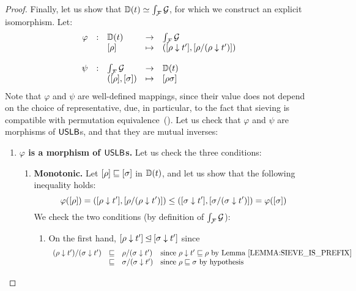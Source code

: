 \begin{proof}
Finally, let us show that $\mathbb{D}(t) \simeq \int_{\mathcal{F}}{\mathcal{G}}$,
for which we construct an explicit isomorphism.
Let:
\[
\begin{array}{rclcl}
  \varphi & : & \mathbb{D}(t)        & \to     & \int_{\mathcal{F}}{\mathcal{G}} \\
             &&    {[\rho]} & \mapsto & ({[\rho \downarrow t']}, {[\rho/(\rho \downarrow t')]}) \\
\\
  \psi    & : & \int_{\mathcal{F}}{\mathcal{G}} & \to & \mathbb{D}(t) \\
             &&  ({[\rho]},{[\sigma]}) & \mapsto & [\rho\sigma] \\
\end{array}
\]
Note that $\varphi$ and $\psi$ are well-defined mappings, since their value does not
depend on the choice of representative, due, in particular, to the fact that sieving
is compatible with permutation equivalence~().
Let us check that $\varphi$ and $\psi$ are morphisms of $\mathsf{USLB}$s, and that they are mutual inverses:
\begin{enumerate}
\item {\bf $\varphi$ is a morphism of $\mathsf{USLB}$s.}
  Let us check the three conditions:
  \begin{enumerate}
  \item {\bf Monotonic.}
    Let ${[\rho]} \sqsubseteq {[\sigma]}$ in $\mathbb{D}(t)$,
    and let us show that the following inequality holds:
    \[
      \varphi({[\rho]}) =
      ({[\rho \downarrow t']}, {[\rho/(\rho \downarrow t')]})
      \leq
      ({[\sigma \downarrow t']}, {[\sigma/(\sigma \downarrow t')]})
      = \varphi({[\sigma]})
    \]
    We check the two conditions (by definition of $\int_{\mathcal{F}}{\mathcal{G}}$):
    \begin{enumerate}
    \item On the first hand,
          ${[\rho \downarrow t']} \unlhd {[\sigma\downarrow t']}$
          since
          \[
            \begin{array}{rcll}
            (\redseq \sieve \tm')/(\redseqtwo \sieve \tm')
            & \permle &
            \redseq/(\redseqtwo \sieve \tm') & \text{since $\redseq \sieve \tm' \permle \redseq$ by \rlem{sieve_is_prefix}} \\
            & \permle & \redseqtwo/(\redseqtwo \sieve \tm') & \text{since $\redseq \permle \redseqtwo$ by hypothesis} \\

\end{array}\]
\end{enumerate}
\end{enumerate}
\end{enumerate}
\end{proof}
